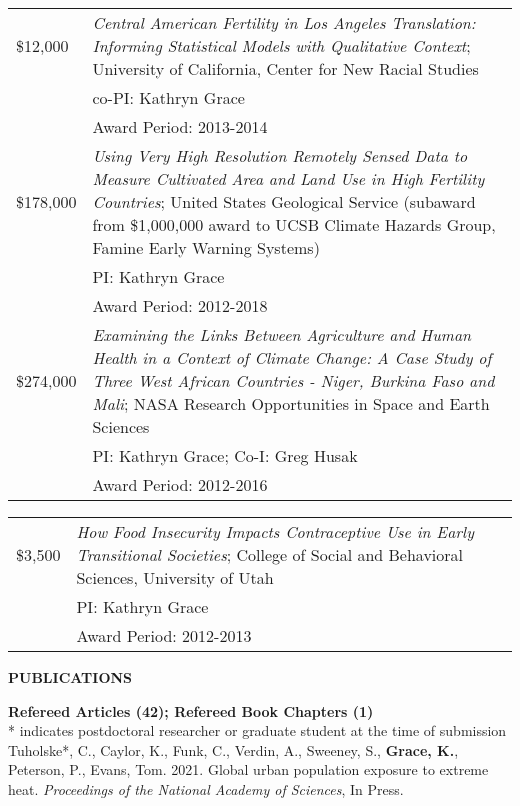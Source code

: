 \documentclass[11pt]{article} %
\begin{document}
\begin{tabular}{lp{11cm}}
\$12,000 & \emph{Central American Fertility in Los Angeles Translation: Informing Statistical Models with Qualitative Context}; University of California, Center for New Racial Studies\\
& co-PI: Kathryn Grace\\
&Award Period: 2013-2014\\

\$178,000 & \emph{Using Very High Resolution Remotely Sensed Data to Measure Cultivated Area and Land Use in High Fertility Countries}; United States Geological Service (subaward from \$1,000,000 award to UCSB Climate Hazards Group, Famine Early Warning Systems)\\
& PI: Kathryn Grace\\
& Award Period: 2012-2018\\


\$274,000 & \emph{Examining the Links Between Agriculture and Human Health in a Context of Climate Change: A Case Study of Three West African Countries - Niger, Burkina Faso and Mali}; NASA Research Opportunities in Space and Earth Sciences\\
 & PI: Kathryn Grace; Co-I: Greg Husak\\
 & Award Period: 2012-2016\\
 
 \end{tabular}

\begin{tabular}{lp{11cm}}

\$3,500 &\emph{How Food Insecurity Impacts Contraceptive Use in Early Transitional Societies}; College of Social and Behavioral Sciences, University of Utah\\
& PI: Kathryn Grace\\
& Award Period: 2012-2013\\
\end{tabular}

\vspace{.5cm}
\noindent
{\large \textbf{PUBLICATIONS}}

\noindent
\textbf {Refereed Articles (42); Refereed Book Chapters (1)}\\
\noindent
* indicates postdoctoral researcher or graduate student at the time of submission\\

\noindent 
Tuholske*, C., Caylor, K., Funk, C., Verdin, A., Sweeney, S., \textbf{Grace, K.}, Peterson, P., Evans, Tom. 2021. Global urban population exposure to extreme heat. \textit{Proceedings of the National Academy of Sciences}, In Press.\\
\end{document}
